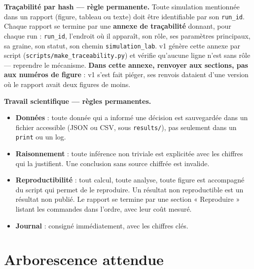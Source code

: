 \documentclass[11pt,a4paper]{article}
\newcommand{\code}[1]{\texttt{#1}}
\begin{document}
\textbf{Traçabilité par hash --- règle permanente.} Toute simulation mentionnée dans un rapport (figure, tableau ou texte) doit être identifiable par son \code{run\_id}. Chaque rapport se termine par une \textbf{annexe de traçabilité} donnant, pour chaque run : \code{run\_id}, l'endroit où il apparaît, son rôle, ses paramètres principaux, sa graine, son statut, son chemin \code{simulation\_lab}. v1 génère cette annexe par script (\code{scripts/make\_traceability.py}) et vérifie qu'aucune ligne n'est sans rôle --- reprendre le mécanisme. \textbf{Dans cette annexe, renvoyer aux sections, pas aux numéros de figure} : v1 s'est fait piéger, ses renvois dataient d'une version où le rapport avait deux figures de moins.

\textbf{Travail scientifique --- règles permanentes.}

\begin{itemize}
\item \textbf{Données} : toute donnée qui a informé une décision est sauvegardée dans un fichier accessible (JSON ou CSV, sous \code{results/}), pas seulement dans un \code{print} ou un log.
\item \textbf{Raisonnement} : toute inférence non triviale est explicitée avec les chiffres qui la justifient. Une conclusion sans source chiffrée est invalide.
\item \textbf{Reproductibilité} : tout calcul, toute analyse, toute figure est accompagné du script qui permet de le reproduire. Un résultat non reproductible est un résultat non publié. Le rapport se termine par une section « Reproduire » listant les commandes dans l'ordre, avec leur coût mesuré.
\item \textbf{Journal} : consigné immédiatement, avec les chiffres clés.
\end{itemize}

\bigskip

\setcounter{section}{10}
\section{Arborescence attendue}
\end{document}
